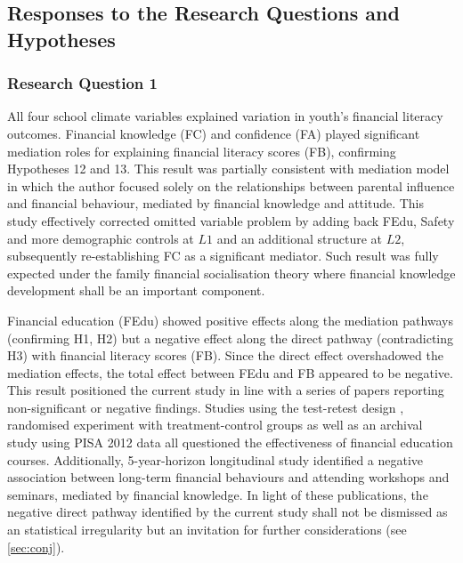 \subsection{Responses to the Research Questions and Hypotheses}

\subsubsection{Research Question 1}

All four school climate variables explained variation in youth's financial literacy outcomes. Financial knowledge (FC) and confidence (FA) played significant mediation roles for explaining financial literacy scores (FB), confirming Hypotheses 12 and 13. This result was partially consistent with  mediation model in which the author focused solely on the relationships between parental influence and financial behaviour, mediated by financial knowledge and attitude. This study effectively corrected  omitted variable problem by adding back FEdu, Safety and more demographic controls at $L1$ and an additional structure at $L2$, subsequently re-establishing FC as a significant mediator. Such result was fully expected under the family financial socialisation theory \parencite{danes:2007} where financial knowledge development shall be an important component.

Financial education (FEdu) showed positive effects along the mediation pathways (confirming H1, H2) but a negative effect along the direct pathway (contradicting H3) with financial literacy scores (FB). Since the direct effect overshadowed the mediation effects, the total effect between FEdu and FB appeared to be negative. This result positioned the current study in line with a series of papers reporting non-significant or negative findings. Studies using the test-retest design \parencite{mandell:2009}, randomised experiment with treatment-control groups \parencite{becchetti:2013, collins:2013} as well as an archival study using PISA 2012 data \parencite{farinella:2017} all questioned the effectiveness of financial education courses. Additionally,  5-year-horizon longitudinal study identified a negative association between long-term financial behaviours and attending workshops and seminars, mediated by financial knowledge. In light of these publications, the negative direct pathway identified by the current study shall not be dismissed as an statistical irregularity but an invitation for further considerations (see \cref{sec:conj}).

